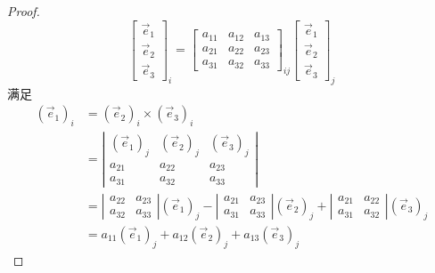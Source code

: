 \begin{proof}
	$$\begin{bmatrix}\vec{e}_1\\\vec{e}_2\\\vec{e}_3\end{bmatrix}_i=\begin{bmatrix}a_{11}&a_{12}&a_{13}\\a_{21}&a_{22}&a_{23}\\a_{31}&a_{32}&a_{33}\end{bmatrix}_{ij}\begin{bmatrix}\vec{e}_1\\\vec{e}_2\\\vec{e}_3\end{bmatrix}_j$$
	满足
	$$\begin{aligned}
		\left(\vec{e}_{1}\right)_{i} & =\left(\vec{e}_{2}\right)_{i} \times\left(\vec{e}_{3}\right)_{i} \\
		& =\left|\begin{array}{ccc}
			\left(\vec{e}_{1}\right)_{j} & \left(\vec{e}_{2}\right)_{j} & \left(\vec{e}_{3}\right)_{j} \\
			a_{21} & a_{22} & a_{23} \\
			a_{31} & a_{32} & a_{33}
		\end{array}\right| \\
		& =\left|\begin{array}{cc}
			a_{22} & a_{23} \\
			a_{32} & a_{33}
		\end{array}\right|\left(\vec{e}_{1}\right)_{j}-\left|\begin{array}{cc}
			a_{21} & a_{23} \\
			a_{31} & a_{33}
		\end{array}\right|\left(\vec{e}_{2}\right)_{j}+\left|\begin{array}{cc}
			a_{21} & a_{22} \\
			a_{31} & a_{32}
		\end{array}\right|\left(\vec{e}_{3}\right)_{j} \\
		& =a_{11}\left(\vec{e}_{1}\right)_{j}+a_{12}\left(\vec{e}_{2}\right)_{j}+a_{13}\left(\vec{e}_{3}\right)_{j}
	\end{aligned}$$
\end{proof}

